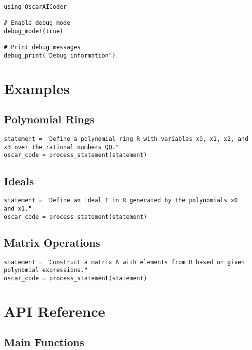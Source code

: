 \documentclass[11pt,a4paper]{article}
\begin{document}
\begin{lstlisting}
using OscarAICoder

# Enable debug mode
debug_mode!(true)

# Print debug messages
debug_print("Debug information")
\end{lstlisting}

\section{Examples}

\subsection{Polynomial Rings}

\begin{lstlisting}
statement = "Define a polynomial ring R with variables x0, x1, x2, and x3 over the rational numbers QQ."
oscar_code = process_statement(statement)
\end{lstlisting}

\subsection{Ideals}

\begin{lstlisting}
statement = "Define an ideal I in R generated by the polynomials x0 and x1."
oscar_code = process_statement(statement)
\end{lstlisting}

\subsection{Matrix Operations}

\begin{lstlisting}
statement = "Construct a matrix A with elements from R based on given polynomial expressions."
oscar_code = process_statement(statement)
\end{lstlisting}

\section{API Reference}

\subsection{Main Functions}
\end{document}
